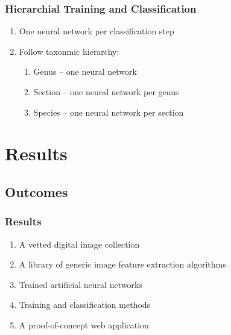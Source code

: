 \documentclass[]{beamer}
\begin{document}
    \begin{frame}
        \frametitle{Hierarchial Training and Classification}

        \begin{enumerate}
            \item One neural network per classification step
            \item Follow taxonmic hierarchy:
            \begin{enumerate}
                \item Genus -- one neural network
                \item Section -- one neural network per genus
                \item Species -- one neural network per section
            \end{enumerate}

        \vspace{10 mm}

        \end{enumerate}
    \end{frame}


\section{Results}

    \subsection{Outcomes}

    \begin{frame}
        \frametitle{Results}

        \begin{enumerate}
            \item A vetted digital image collection
            \item A library of generic image feature extraction algorithms
            \item Trained artificial neural networks
            \item Training and classification methods
            \item A proof-of-concept web application
        \end{enumerate}
    \end{frame}
\end{document}
